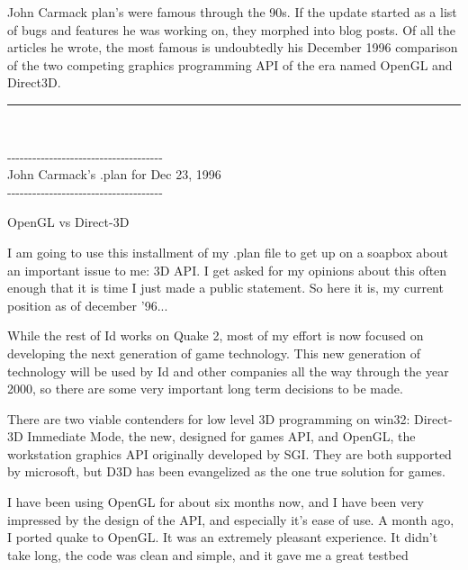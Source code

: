 John Carmack plan's were famous through the 90s. If the update started as a list of bugs and features he was working
on, they morphed into blog posts. Of all the articles he wrote, the most famous is undoubtedly his December 1996 comparison of the two competing graphics programming API of the era named OpenGL and Direct3D.\\
\par
\label{openglvsdirectd}
\hrule \par \bigskip
{}\\
\begin{allintypewriter}
{-}{-}{-}{-}{-}{-}{-}{-}{-}{-}{-}{-}{-}{-}{-}{-}{-}{-}{-}{-}{-}{-}{-}{-}{-}{-}{-}{-}{-}{-}{-}{-}{-}{-}{-}{-}{-}\\
John Carmack's .plan for Dec 23, 1996\\
{-}{-}{-}{-}{-}{-}{-}{-}{-}{-}{-}{-}{-}{-}{-}{-}{-}{-}{-}{-}{-}{-}{-}{-}{-}{-}{-}{-}{-}{-}{-}{-}{-}{-}{-}{-}{-}\\
\par
OpenGL vs Direct-3D\\
\par
I am going to use this installment of my .plan file to get up on a soapbox
about an important issue to me: 3D API. I get asked for my opinions about
this often enough that it is time I just made a public statement. So here
it is, my current position as of december '96...\\ 
\par
While the rest of Id works on Quake 2, most of my effort is now focused on
developing the next generation of game technology. This new generation of
technology will be used by Id and other companies all the way through the
year 2000, so there are some very important long term decisions to be made.\\ 
\par
There are two viable contenders for low level 3D programming on win32: 
Direct-3D Immediate Mode, the new, designed for games API, and OpenGL, the
workstation graphics API originally developed by SGI. They are both 
supported by microsoft, but D3D has been evangelized as the one true solution
for games.\\ 
\par
I have been using OpenGL for about six months now, and I have been very 
impressed by the design of the API, and especially it's ease of use. A month
ago, I ported quake to OpenGL. It was an extremely pleasant experience. It 
didn't take long, the code was clean and simple, and it gave me a great testbed

\end{allintypewriter}
